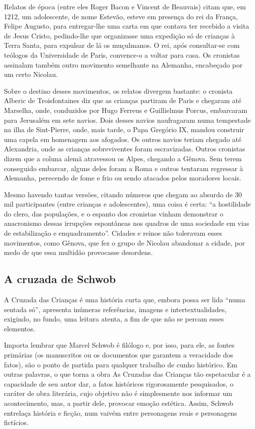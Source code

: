 \documentclass[12pt]{extarticle}
\begin{document}
Relatos de época (entre eles Roger Bacon e Vincent de Beauvais) citam
que, em 1212, um adolescente, de nome Estevão, esteve em presença do rei
da França, Felipe Augusto, para entregar-lhe uma carta em que contava
ter recebido a visita de Jesus Cristo, pedindo-lhe que organizasse uma
expedição só de crianças à Terra Santa, para expulsar de lá os
muçulmanos. O rei, após consultar-se com teólogos da Universidade de
Paris, convence-o a voltar para casa. Os cronistas assinalam também
outro movimento semelhante na Alemanha, encabeçado por um certo
Nicolau.

Sobre o destino desses movimentos, os relatos divergem bastante: o
cronista Alberic de Troisfontaines diz que as crianças partiram de Paris
e chegaram até Marselha, onde, conduzidos por Hugo Ferreus e Guillielmus
Porcus, embarcaram para Jerusalém em sete navios. Dois desses navios
naufragaram numa tempestade na ilha de Sint-Pierre, onde, mais tarde, o
Papa Gregório IX, mandou construir uma capela em homenagem aos afogados.
Os outros navios teriam chegado até Alexandria, onde as crianças
sobreviventes foram escravizadas. Outros cronistas dizem que a coluna
alemã atravessou os Alpes, chegando a Gênova. Sem terem conseguido
embarcar, alguns deles foram a Roma e outros tentaram regressar à
Alemanha, perecendo de fome e frio ou sendo atacados pelos moradores
locais.

Mesmo havendo tantas versões, citando números que chegam ao absurdo de
30 mil participantes (entre crianças e adolescentes), uma coisa é certa:
``a hostilidade do clero, das populações, e o espanto dos cronistas
vinham demonstrar o anacronismo dessas irrupções espontâneas nos quadros
de uma sociedade em vias de estabilização e enquadramento''. Cidades e
reinos não toleravam esses movimentos, como Gênova, que fez o grupo de
Nicolau abandonar a cidade, por medo de que essa multidão provocasse
desordens.

\subsection{A cruzada de Schwob}

A Cruzada das Crianças é uma história curta que, embora possa ser lida
``numa sentada só'', apresenta inúmeras referências, imagens e
intertextualidades, exigindo, no fundo, uma leitura atenta, a fim de que
não se percam esses elementos.

Importa lembrar que Marcel Schwob é filólogo e, por isso, para ele, as
fontes primárias (os manuscritos ou os documentos que garantem a
veracidade dos fatos), são o ponto de partida para qualquer trabalho de
cunho histórico. Em outras palavras, o que torna a obra As Cruzadas das
Crianças tão espetacular é a capacidade de seu autor dar, a fatos
históricos rigorosamente pesquisados, o caráter de obra literária, cujo
objetivo não é simplesmente nos informar um acontecimento, mas, a partir
dele, provocar emoção estética. Assim, Schwob entrelaça história e
ficção, num vaivém entre personagens reais e personagens fictícios.
\end{document}
